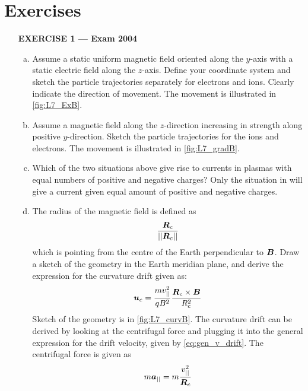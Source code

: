 \section{Exercises}
\begin{enumerate}
    \item [\textbf{EXERCISE 1 --- Exam 2004}]~\vspace{1pt}\begin{enumerate}[(a)]
        \item Assume a static uniform magnetic field oriented along the \(y\)-axis with a static electric field along the \(z\)-axis. Define your coordinate system and sketch the particle trajectories separately for electrons and ions. Clearly indicate the direction of movement.
        \mylinbrk{}
        The movement is illustrated in \cref{fig:L7_ExB}.
        \item Assume a magnetic field along the \(z\)-direction increasing in strength along positive \(y\)-direction. Sketch the particle trajectories for the ions and electrons.
        \mylinbrk{}
        The movement is illustrated in \cref{fig:L7_gradB}.
        \item Which of the two situations above give rise to currents in plasmas with equal numbers of positive and negative charges?
        \mylinbrk{}
        Only the situation in  will give a current given equal amount of positive and negative charges.
        \item The radius of the magnetic field is defined as
        \begin{equation*}
            \frac{\boldsymbol{R}_c}{||\boldsymbol{R}_c||}
        \end{equation*}
        which is pointing from the centre of the Earth perpendicular to \(\boldsymbol{B}\). Draw a sketch of the geometry in the Earth meridian plane, and derive the expression for the curvature drift given as:
        \begin{equation*}
            \boldsymbol{u}_c=\frac{mv_{||}^2}{qB^2}\frac{\boldsymbol{R}_c\times\boldsymbol{B}}{R_c^2}
        \end{equation*}
        \mylinbrk{}
        Sketch of the geometry is in \cref{fig:L7_curvB}. The curvature drift can be derived by looking at the centrifugal force and plugging it into the general expression for the drift velocity, given by \cref{eq:gen_v_drift}. The centrifugal force is given as
        \begin{equation*}
            m\boldsymbol{a}_{||}=m\frac{v_{||}^2}{\boldsymbol{R}_c}
        \end{equation*}

\end{enumerate}
\end{enumerate}

